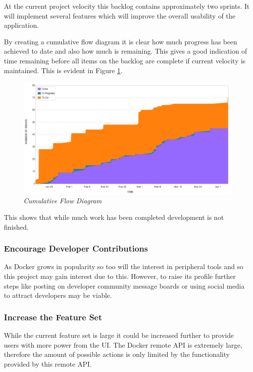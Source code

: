 At the current project velocity this backlog contains approximately two sprints. It will implement several features which will improve the overall usability of the application. 

By creating a cumulative flow diagram it is clear how much progress has been achieved to date and also how much is remaining. This gives a good indication of time remaining before all items on the backlog are complete if current velocity is maintained. This is evident in Figure \ref{fig:cumulative_flow}.

\clearpage

\begin{figure}[!ht]
	\centering
	\includegraphics*[width=\textwidth]{images/cumulative_flow}
	\caption{\em Cumulative Flow Diagram}
	\label{fig:cumulative_flow}
\end{figure}

This shows that while much work has been completed development is not finished.

\subsubsection{Encourage Developer Contributions}
As Docker grows in popularity so too will the interest in peripheral tools and so this project may gain interest due to this. However, to raise its profile further steps like posting on developer community message boards or using social media to attract developers may be viable.

\subsubsection{Increase the Feature Set}
While the current feature set is large it could be increased further to provide users with more power from the UI. The Docker remote API is extremely large, therefore the amount of possible actions is only limited by the functionality provided by this remote API.

